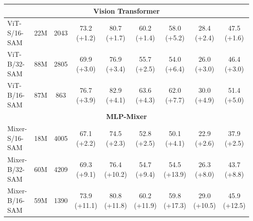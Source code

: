 \documentclass{article}
\begin{document}
\begin{table}
{\begin{tabular}{l|cc|ccc|ccc}
    \multicolumn{9}{c}{\textbf{Vision Transformer}} \\ \midrule 
    ViT-S/16-SAM & 22M & 2043 & 73.2 (+1.2) & 80.7 (+1.7) & 60.2 (+1.4) & 58.0 (+5.2) & 28.4 (+2.4) & 47.5 (+1.6) \\ 
    ViT-B/32-SAM & 88M & 2805 & 69.9 (+3.0) & 76.9 (+3.4) & 55.7 (+2.5) & 54.0 (+6.4) & 26.0 (+3.0) & 46.4 (+3.0) \\ 
    ViT-B/16-SAM & 87M & 863 & 76.7 (+3.9) & 82.9 (+4.1) & 63.6 (+4.3) & 62.0 (+7.7) & 30.0 (+4.9) & 51.4 (+5.0) \\ \midrule 
    
    \multicolumn{9}{c}{\textbf{MLP-Mixer}} \\ \midrule 
    Mixer-S/16-SAM & 18M & 4005 & 67.1 (+2.2) & 74.5 (+2.3) & 52.8 (+2.5) & 50.1 (+4.1) & 22.9 (+2.6) & 37.9 (+2.5) \\ 
    Mixer-B/32-SAM & 60M & 4209 & 69.3 (+9.1) & 76.4 (+10.2) & 54.7 (+9.4) & 54.5 (+13.9) & 26.3 (+8.0) & 43.7 (+8.8) \\ 
    Mixer-B/16-SAM & 59M & 1390 & 73.9 (+11.1) & 80.8 (+11.8) & 60.2 (+11.9) & 59.8 (+17.3) & 29.0 (+10.5) & 45.9 (+12.5)\\
    \bottomrule
    
    \end{tabular}}
    \vspace{-10pt}
\end{table}
\end{document}
